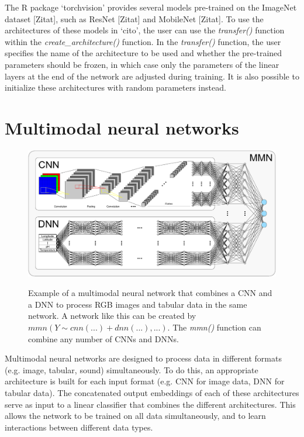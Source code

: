 \documentclass[12pt,twoside]{scrreport}
\newcommand{\pkg}[1]{`#1'}
\newcommand{\fn}[2][]{\textit{#2(}#1\textit{)}}
\begin{document}
The R package \pkg{torchvision} provides several models pre-trained on the ImageNet dataset [Zitat], such as ResNet [Zitat] and MobileNet [Zitat]. To use the architectures of these models in \pkg{cito}, the user can use the \fn{transfer} function within the \fn{create\_architecture} function. In the \fn{transfer} function, the user specifies the name of the architecture to be used and whether the pre-trained parameters should be frozen, in which case only the parameters of the linear layers at the end of the network are adjusted during training. It is also possible to initialize these architectures with random parameters instead.

\section*{Multimodal neural networks}

\begin{figure}
	\includegraphics[width=\textwidth]{MMN.pdf}
	\label{MMN}
	\caption{Example of a multimodal neural network that combines a CNN and a DNN to process RGB images and tabular data in the same network. A network like this can be created by $mmn(Y \sim cnn(...) + dnn(...), ...)$. The \fn{mmn} function can combine any number of CNNs and DNNs.}
\end{figure}

Multimodal neural networks are designed to process data in different formats (e.g. image, tabular, sound) simultaneously. To do this, an appropriate architecture is built for each input format (e.g. CNN for image data, DNN for tabular data). The concatenated output embeddings of each of these architectures serve as input to a linear classifier that combines the different architectures. This allows the network to be trained on all data simultaneously, and to learn interactions between different data types.
\end{document}
